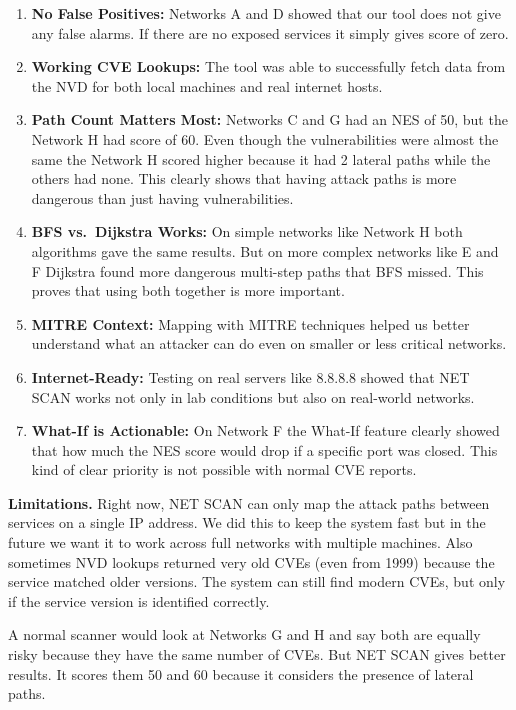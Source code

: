 \documentclass[conference]{IEEEtran}
\begin{document}
\begin{enumerate}
    \item \textbf{No False Positives:} Networks A and D showed that our tool does not give any false alarms. If there are no exposed services it simply gives score of zero.
    \item \textbf{Working CVE Lookups:} The tool was able to successfully fetch data from the NVD for both local machines and real internet hosts.
    \item \textbf{Path Count Matters Most:} Networks C and G had an NES of 50, but the Network H had score of 60. Even though the vulnerabilities were almost the same the Network H scored higher because it had 2 lateral paths while the others had none. This clearly shows that having attack paths is more dangerous than just having vulnerabilities.
    \item \textbf{BFS vs.\ Dijkstra Works:} On simple networks like Network H both algorithms gave the same results. But on more complex networks like E and F Dijkstra found more dangerous multi-step paths that BFS missed. This proves that using both together is more important.
    \item \textbf{MITRE Context:} Mapping with MITRE techniques helped us better understand what an attacker can do even on smaller or less critical networks.
    \item \textbf{Internet-Ready:} Testing on real servers like 8.8.8.8 showed that NET SCAN works not only in lab conditions but also on real-world networks.
    \item \textbf{What-If is Actionable:} On Network F the What-If feature clearly showed that how much the NES score would drop if a specific port was closed. This kind of clear priority is not possible with normal CVE reports.
\end{enumerate}

\textbf{Limitations.}
Right now, NET SCAN can only map the attack paths between services on a single IP address. We did this to keep the system fast but in the future we want it to work across full networks with multiple machines. Also sometimes NVD lookups returned very old CVEs (even from 1999) because the service matched older versions. The system can still find modern CVEs, but only if the service version is identified correctly.

A normal scanner would look at Networks G and H and say both are equally risky because they have the same number of CVEs. But NET SCAN gives better results. It scores them 50 and 60 because it considers the presence of lateral paths.
\end{document}
